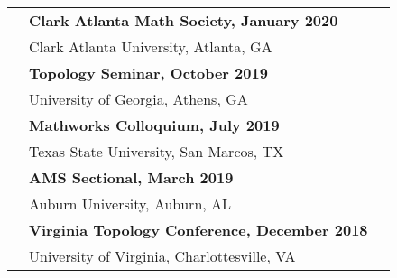\documentclass[letterpaper,11pt,oneside]{article}
\begin{document}
\begin{tabular}{@{} l l l}
       & \textbf{Clark Atlanta Math Society, January 2020} \\
     & Clark Atlanta University, Atlanta, GA\\
     

            & \textbf{Topology Seminar, October 2019} \\
     & University of Georgia, Athens, GA\\

     
        &\textbf{Mathworks Colloquium, July 2019} \\
     & Texas State University, San Marcos, TX \\
     
              & \textbf{AMS Sectional, March 2019} \\
     & Auburn University, Auburn, AL\\
     
        
     
    
       
        & \textbf{Virginia Topology Conference, December 2018} \\
     & University of Virginia, Charlottesville, VA\\
     
                 \end{tabular}
\end{document}
